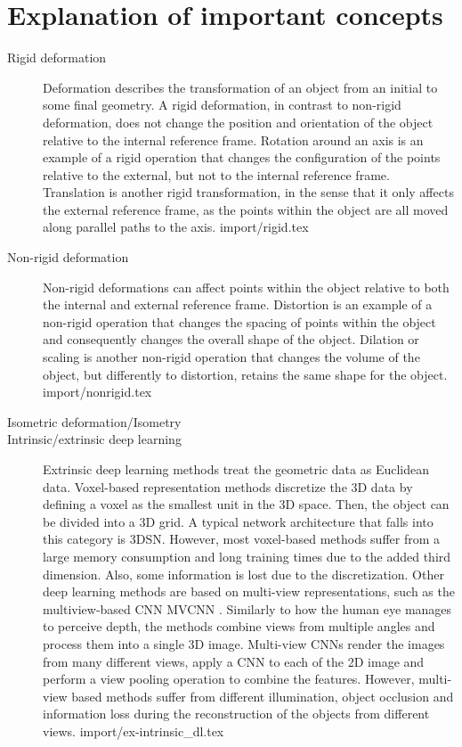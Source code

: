 \documentclass[class=article, crop=false]{standalone}
\begin{document}
\section{Explanation of important concepts}
\label{sec:app1}
\begin{description}
    \item[Rigid deformation] Deformation describes the transformation of an object from an initial to some final geometry. A rigid deformation, in contrast to non-rigid deformation, does not change the position and orientation of the object relative to the internal reference frame. Rotation around an axis is an example of a rigid operation that changes the configuration of the points relative to the external, but not to the internal reference frame. Translation is another rigid transformation, in the sense that it only affects the external reference frame, as the points within the object are all moved along parallel paths to the axis.
    {import/rigid.tex}
    
    \item[Non-rigid deformation] Non-rigid deformations can affect points within the object relative to both the internal and external reference frame. Distortion is an example of a non-rigid operation that changes the spacing of points within the object and consequently changes the overall shape of the object. Dilation or scaling is another non-rigid operation that changes the volume of the object, but differently to distortion, retains the same shape for the object.
    {import/nonrigid.tex}
    
    \item[Isometric deformation/Isometry] 
    
    \item[Intrinsic/extrinsic deep learning] Extrinsic deep learning methods treat the geometric data as Euclidean data. Voxel-based representation methods discretize the 3D data by defining a voxel as the smallest unit in the 3D space. Then, the object can be divided into a 3D grid. A typical network architecture that falls into this category is 3DSN. However, most voxel-based methods suffer from a large memory consumption and long training times due to the added third dimension. Also, some information is lost due to the discretization. Other deep learning methods are based on multi-view representations, such as the multiview-based CNN MVCNN \cite{mvcnn}. Similarly to how the human eye manages to perceive depth, the methods combine views from multiple angles and process them into a single 3D image. Multi-view CNNs render the images from many different views, apply a CNN to each of the 2D image and perform a view pooling operation to combine the features. However, multi-view based methods suffer from different illumination, object occlusion and information loss during the reconstruction of the objects from different views.
    {import/ex-intrinsic_dl.tex}
    

\end{description}
\end{document}
